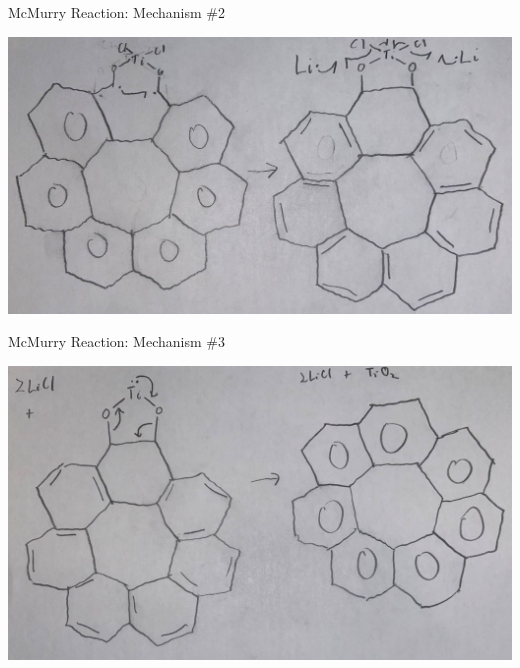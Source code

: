 \documentclass[notes]{beamer}
\begin{document}
\begin{frame}{McMurry Reaction: Mechanism \#2}
\begin{center}
    \includegraphics[scale=.35]{mcmurry_reaction_two.JPG}
\end{center}
\end{frame}

\begin{frame}{McMurry Reaction: Mechanism \#3}
\begin{center}
    \includegraphics[scale=.35]{mcmurry_reaction_three.JPG}
\end{center}
\end{frame}
\end{document}
